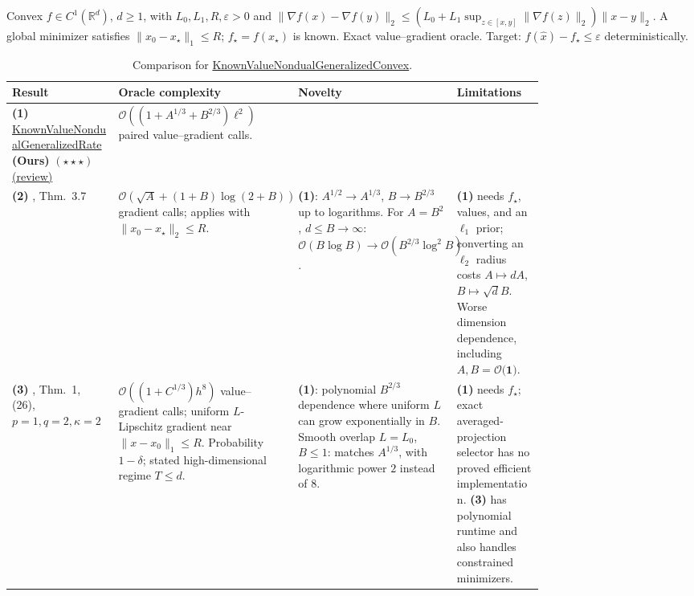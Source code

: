 \begin{table}[tp]
\centering
\caption{Comparison for \href{https://github.com/k3nfalt/longtails/blob/main/LongTails/Setups/KnownValueNondualGeneralizedConvex.lean}{KnownValueNondualGeneralizedConvex}.}\label{tab:KnownValueNondualGeneralizedConvex}
\parbox{\linewidth}{\footnotesize Convex $f\in C^1(\mathbb R^d)$, $d\ge1$, with $L_0,L_1,R,\varepsilon>0$ and $\|\nabla f(x)-\nabla f(y)\|_2\le (L_0+L_1\sup_{z\in[x,y]}\|\nabla f(z)\|_2)\|x-y\|_2$. A global minimizer satisfies $\|x_0-x_\star\|_1\le R$; $f_\star=f(x_\star)$ is known. Exact value--gradient oracle. Target: $f(\hat x)-f_\star\le\varepsilon$ deterministically.}\par\smallskip
\begin{threeparttable}
\footnotesize
\setlength{\tabcolsep}{4pt}\renewcommand{\arraystretch}{1.25}
\begin{tabularx}{\linewidth}{@{}>{\raggedright\arraybackslash}p{0.20\linewidth}>{\raggedright\arraybackslash}p{0.32\linewidth}>{\raggedright\arraybackslash}p{0.25\linewidth}>{\raggedright\arraybackslash}X@{}}
\toprule
\textbf{Result} & \textbf{Oracle complexity} & \textbf{Novelty} & \textbf{Limitations} \\
\midrule
\textbf{(1)} \href{https://github.com/k3nfalt/longtails/blob/main/LongTails/Theorems/KnownValueNondualGeneralizedRate.lean}{Known\allowbreak Value\allowbreak Nondual\allowbreak Generalized\allowbreak Rate} \textbf{(Ours)} $(\star\star\star)$ \href{https://github.com/k3nfalt/longtails/blob/main/scripts/reviews/KnownValueNondualGeneralizedRate.md}{(review)} & $\mathcal{O}((1+A^{1/3}+B^{2/3})\ell^2)$ paired value--gradient calls. & & \\
\midrule[1.2pt]
\textbf{(2)} \citep{kvngEverest2026v1}, Thm.~3.7 & $\mathcal{O}(\sqrt A+(1+B)\log(2+B))$ gradient calls; applies with $\|x_0-x_\star\|_2\le R$. & \textbf{(1)}: $A^{1/2}\to A^{1/3}$, $B\to B^{2/3}$ up to logarithms. For $A=B^2$, $d\le B\to\infty$: $\mathcal{O}(B\log B)\to\mathcal{O}(B^{2/3}\log^2 B)$. & \textbf{(1)} needs $f_\star$, values, and an $\ell_1$ prior; converting an $\ell_2$ radius costs $A\mapsto dA$, $B\mapsto\sqrt d B$. Worse dimension dependence, including $A,B=\mathcal{O}\textbf{(1)}$. \\
\midrule
\textbf{(3)} \citep{kvngNondual2026v1}, Thm.~1, (26), $p=1,q=2,\kappa=2$ & $\mathcal{O}((1+C^{1/3})h^8)$ value--gradient calls; uniform $L$-Lipschitz gradient near $\|x-x_0\|_1\le R$. Probability $1-\delta$; stated high-dimensional regime $T\le d$. & \textbf{(1)}: polynomial $B^{2/3}$ dependence where uniform $L$ can grow exponentially in $B$. Smooth overlap $L=L_0$, $B\le1$: matches $A^{1/3}$, with logarithmic power $2$ instead of $8$. & \textbf{(1)} needs $f_\star$; exact averaged-projection selector has no proved efficient implementation. \textbf{(3)} has polynomial runtime and also handles constrained minimizers. \\

\end{tabularx}
\end{threeparttable}
\end{table}
